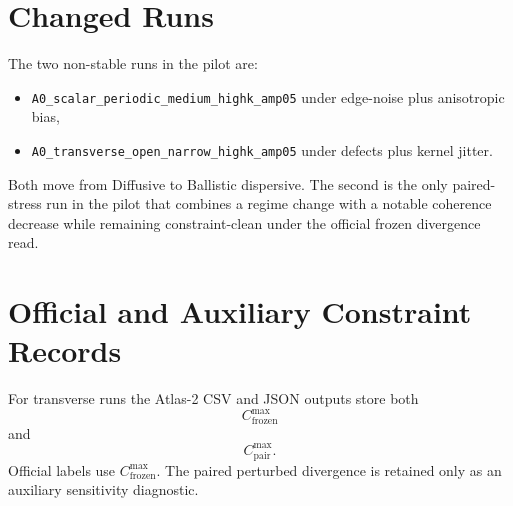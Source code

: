 \documentclass[11pt]{article}
\begin{document}
\section{Changed Runs}
The two non-stable runs in the pilot are:
\begin{itemize}
\item \texttt{A0\_scalar\_periodic\_medium\_highk\_amp05} under edge-noise plus anisotropic bias,
\item \texttt{A0\_transverse\_open\_narrow\_highk\_amp05} under defects plus kernel jitter.
\end{itemize}
Both move from Diffusive to Ballistic dispersive. The second is the only paired-stress run in the pilot that combines a regime change with a notable coherence decrease while remaining constraint-clean under the official frozen divergence read.

\section{Official and Auxiliary Constraint Records}
For transverse runs the Atlas-2 CSV and JSON outputs store both
\begin{equation}
C_{\mathrm{frozen}}^{\max}
\end{equation}
and
\begin{equation}
C_{\mathrm{pair}}^{\max}.
\end{equation}
Official labels use $C_{\mathrm{frozen}}^{\max}$. The paired perturbed divergence is retained only as an auxiliary sensitivity diagnostic.
\end{document}
